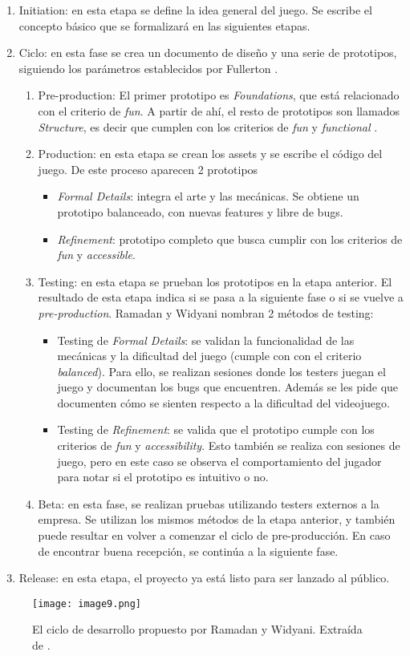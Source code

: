 \begin{enumerate}
    \item Initiation: en esta etapa se define la idea general del juego. Se escribe el concepto básico que se formalizará en las siguientes etapas.
    \item Ciclo: en esta fase se crea un documento de diseño y una serie de prototipos, siguiendo los parámetros establecidos por Fullerton \cite{fullertonGameDesignWorkshop2008}.
    \begin{enumerate}
        \item Pre-production: El primer prototipo es \textit{Foundations}, que está relacionado con el criterio de \textit{fun}. A partir de ahí, el resto de prototipos son llamados \textit{Structure}, es decir que cumplen con los criterios de \textit{fun} y \textit{functional} \cite{ramadanGameDevelopmentLife2013}.
        \item Production: en esta etapa se crean los assets y se escribe el código del juego. De este proceso aparecen 2 prototipos 
        \begin{itemize}
            \item \textit{Formal Details}: integra el arte y las mecánicas. Se obtiene un prototipo balanceado, con nuevas features y libre de bugs.
            \item \textit{Refinement}: prototipo completo que busca cumplir con los criterios de \textit{fun} y \textit{accessible}.
        \end{itemize}
        \item Testing: en esta etapa se prueban los prototipos en la etapa anterior. El resultado de esta etapa indica si se pasa a la siguiente fase o si se vuelve a \textit{pre-production}. Ramadan y Widyani \cite{ramadanGameDevelopmentLife2013} nombran 2 métodos de testing:
        \begin{itemize}
            \item Testing de \textit{Formal Details}: se validan la funcionalidad de las mecánicas y la dificultad del juego (cumple con con el criterio \textit{balanced}). Para ello, se realizan sesiones donde los testers juegan el juego y documentan los bugs que encuentren. Además se les pide que documenten cómo se sienten respecto a la dificultad del videojuego.
            \item Testing de \textit{Refinement}: se valida que el prototipo cumple con los criterios de \textit{fun} y \textit{accessibility}. Esto también se realiza con sesiones de juego, pero en este caso se observa el comportamiento del jugador para notar si el prototipo es intuitivo o no.
        \end{itemize}
        \item Beta: en esta fase, se realizan pruebas utilizando testers externos a la empresa. Se utilizan los mismos métodos de la etapa anterior, y también puede resultar en volver a comenzar el ciclo de pre-producción. En caso de encontrar buena recepción, se continúa a la siguiente fase.
    \end{enumerate}
    \item Release: en esta etapa, el proyecto ya está listo para ser lanzado al público.
\end{enumerate}
\begin{figure}[H]
  \centering
  \texttt{[image: image9.png]}
  \caption{El ciclo de desarrollo propuesto por Ramadan y Widyani. Extraída de \cite{ramadanGameDevelopmentLife2013}.}
  \label{fig:x gdlc Ramadan y Widyani}
\end{figure}